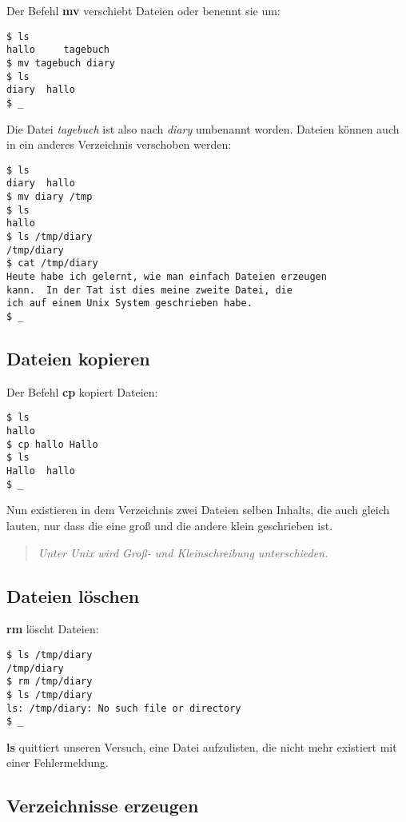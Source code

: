 \documentclass[titlepage,a4paper]{article}
\begin{document}
Der Befehl \textbf{mv} verschiebt Dateien oder benennt sie um:

\begin{verbatim}
$ ls
hallo     tagebuch
$ mv tagebuch diary
$ ls
diary  hallo
$ _
\end{verbatim}

Die Datei \emph{tagebuch} ist also nach \emph{diary} umbenannt worden.
Dateien können auch in ein anderes Verzeichnis verschoben werden:

\begin{verbatim}
$ ls
diary  hallo
$ mv diary /tmp
$ ls
hallo
$ ls /tmp/diary
/tmp/diary
$ cat /tmp/diary
Heute habe ich gelernt, wie man einfach Dateien erzeugen
kann.  In der Tat ist dies meine zweite Datei, die
ich auf einem Unix System geschrieben habe.
$ _
\end{verbatim}


\subsection{Dateien kopieren}
\label{sec:cp}

Der Befehl \textbf{cp} kopiert Dateien:

\begin{verbatim}
$ ls
hallo
$ cp hallo Hallo
$ ls
Hallo  hallo
$ _
\end{verbatim}

Nun existieren in dem Verzeichnis zwei Dateien selben Inhalts, die auch gleich
lauten, nur dass die eine groß und die andere klein geschrieben ist.

\begin{quote}
  \emph{Unter Unix wird Groß- und Kleinschreibung unterschieden.}
\end{quote}

\subsection{Dateien löschen}
\label{sec:rm}

\textbf{rm} löscht Dateien:

\begin{verbatim}
$ ls /tmp/diary
/tmp/diary
$ rm /tmp/diary
$ ls /tmp/diary
ls: /tmp/diary: No such file or directory
$ _
\end{verbatim}

\textbf{ls} quittiert unseren Versuch, eine Datei aufzulisten, die nicht mehr
existiert mit einer Fehlermeldung.

\subsection{Verzeichnisse erzeugen}
\label{sec:mkdir}
\end{document}

